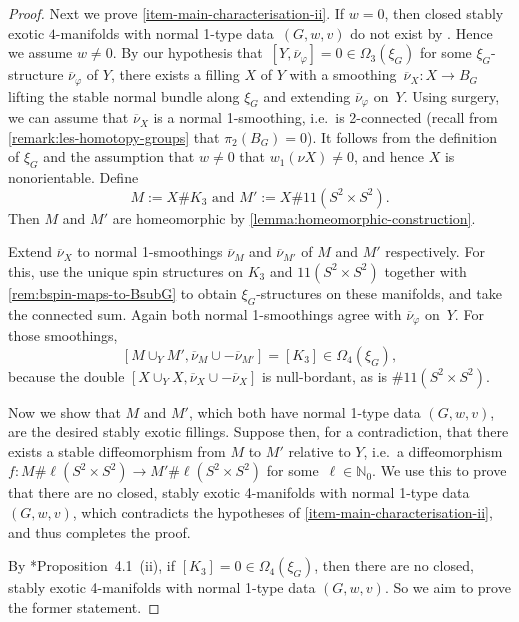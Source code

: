 \documentclass[a4paper, reqno]{amsart}
\theoremstyle{definition}
\theoremstyle{remark}
\newcommand{\N}{\mathbb{N}}
\newcommand{\ol}{\overline}
\begin{document}
\begin{proof}
Next we prove \eqref{item-main-characterisation-ii}. If $w=0$, then closed stably exotic $4$-manifolds with normal 1-type data~$(G,w,v)$ do not exist by \cite{Gompf84}. Hence we assume $w\neq 0$. By our hypothesis that~$[Y,\ol{\nu}_\varphi] = 0 \in \Omega_3(\xi_G)$ for some $\xi_G$-structure $\ol{\nu}_\varphi$ of $Y$, there exists a filling $X$ of $Y$ with a smoothing~$\ol{\nu}_X \colon X \to B_G$ lifting the stable normal bundle along $\xi_G$ and extending $\ol{\nu}_\varphi$ on~$Y$. 
Using surgery, we can assume that $\ol{\nu}_X$ is a normal 1-smoothing, i.e.\ is 2-connected (recall from \cref{remark:les-homotopy-groups} that $\pi_2(B_G)=0$).   It follows from the definition of $\xi_G$ and the assumption that $w \neq 0$ that $w_1(\nu X) \neq 0$, and hence $X$ is nonorientable.  Define
\[M:= X \# K_3 \text{ and } M' := X \# 11(S^2 \times S^2).\]
Then $M$ and $M'$ are homeomorphic by \cref{lemma:homeomorphic-construction}.

Extend $\ol{\nu}_X$ to normal 1-smoothings $\ol{\nu}_M$ and $\ol{\nu}_{M'}$ of $M$ and $M'$  respectively. For this, use the unique spin structures on $K_3$ and $11(S^2 \times S^2)$ together with \cref{rem:bspin-maps-to-BsubG} to obtain $\xi_G$-structures on these manifolds, and take the connected sum.  Again both normal 1-smoothings agree with $\ol{\nu}_\varphi$ on~$Y$. For those smoothings, \[[M \cup_Y M', \ol{\nu}_M \cup - \ol{\nu}_{M'}]=[K_3] \in \Omega_4(\xi_G),\] 
because the double $[X \cup_Y X, \ol{\nu}_X \cup - \ol{\nu}_X]$ is null-bordant, as is $\# 11(S^2 \times S^2)$. 

Now we show that $M$ and $M'$, which both have normal 1-type data $(G,w,v)$, are the desired stably exotic fillings. 
Suppose then, for a contradiction, that there exists a stable diffeomorphism from $M$ to $M'$ relative to $Y$, i.e.\ a diffeomorphism $f \colon M \# \ell(S^2 \times S^2) \to M' \# \ell(S^2 \times S^2)$ for some~$\ell \in \N_0$. We use this to prove that there are no closed, stably exotic 4-manifolds with normal 1-type data $(G,w,v)$, which contradicts the hypotheses of \eqref{item-main-characterisation-ii}, and thus completes the proof. 

By \cite{Kasprowski-Powell}*{Proposition~4.1~(ii)}, 
if $[K_3]=0 \in \Omega_4(\xi_G)$, then there are no closed, stably exotic 4-manifolds with normal 1-type data $(G,w,v)$. So we aim to prove the former statement.


\end{proof}
\end{document}
